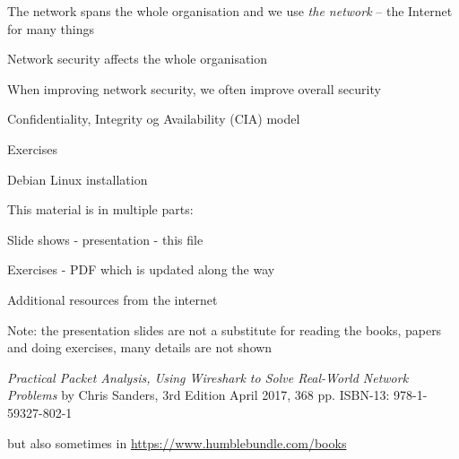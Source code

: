 \documentclass[Screen16to9,17pt]{foils}
\begin{document}
\begin{list2}
\item The network spans the whole organisation and we use \emph{the network} -- the Internet for many things
\item Network security affects the whole organisation
\item When improving network security, we often improve overall security
\end{list2}



\begin{list2}
\item Confidentiality, Integrity og Availability (CIA) model
\item
\item
\item
\item

\end{list2}

Exercises
\begin{list2}
\item Debian Linux installation
\end{list2}





\begin{list1}
\item This material is in multiple parts:

\item Slide shows - presentation - this file
\item Exercises - PDF which is updated along the way

\item Additional resources from the internet

\end{list1}

{\Large Note: the presentation slides are not a substitute for reading the books, papers and doing exercises, many details are not shown}


\emph{Practical Packet Analysis,
Using Wireshark to Solve Real-World Network Problems}
by Chris Sanders, 3rd Edition
April 2017, 368 pp.
ISBN-13:
978-1-59327-802-1

 but also sometimes in \url{https://www.humblebundle.com/books}
\end{document}
